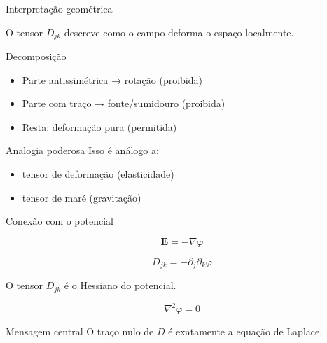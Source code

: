 \documentclass[aspectratio=169,11pt]{beamer}
\begin{document}
\begin{frame}{Interpretação geométrica}

\begin{mybox}
\justifying
O tensor \(D_{jk}\) descreve como o campo \alert{deforma o espaço localmente}.
\end{mybox}

\vspace{0.2cm}

\begin{block}{Decomposição}
\begin{itemize}
    \item Parte antissimétrica → rotação (proibida)
    \item Parte com traço → fonte/sumidouro (proibida)
    \item Resta: deformação pura (permitida)
\end{itemize}
\end{block}

\vspace{0.2cm}

\begin{alertblock}{Analogia poderosa}
Isso é análogo a:
\begin{itemize}
    \item tensor de deformação (elasticidade)
    \item tensor de maré (gravitação)
\end{itemize}
\end{alertblock}

\end{frame}

\begin{frame}{Conexão com o potencial}

\begin{eqbox}
\begin{equation}
\mathbf{E} = -\nabla \varphi
\end{equation}
\end{eqbox}

\vspace{0.2cm}

\begin{eqbox}
\begin{equation}
D_{jk} = -\partial_j \partial_k \varphi
\end{equation}
\end{eqbox}


\begin{mybox}
\justifying
O tensor \(D_{jk}\) é o \alert{Hessiano do potencial}.
\end{mybox}


\begin{eqbox}
\begin{equation}
\nabla^2 \varphi = 0
\end{equation}
\end{eqbox}


\begin{alertblock}{Mensagem central}
O traço nulo de \(D\) é exatamente a equação de Laplace.
\end{alertblock}

\end{frame}
\end{document}
